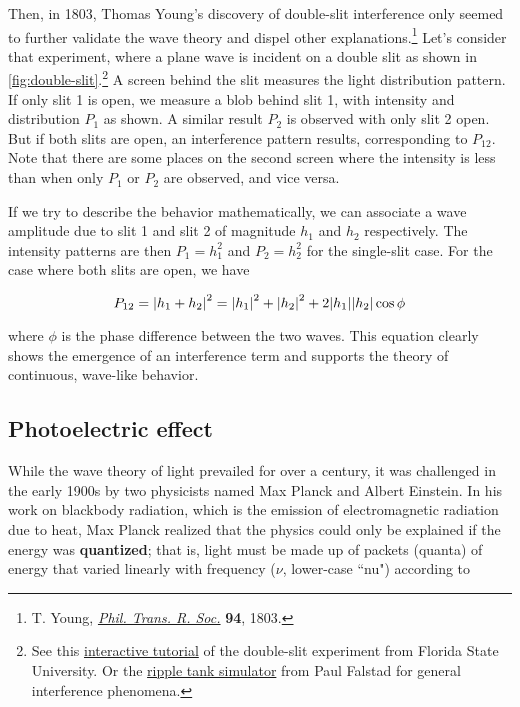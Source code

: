 Then, in 1803, Thomas Young's discovery of double-slit interference only seemed to further validate the wave theory and dispel other explanations.\footnote{T. Young, \href{https://royalsocietypublishing.org/doi/abs/10.1098/rstl.1804.0001}{\emph{Phil. Trans. R. Soc.}} \textbf{94}, 1803.}
Let's consider that experiment, where a plane wave is incident on a double slit as shown in \autoref{fig:double-slit}.\footnote{See this \href{http://micro.magnet.fsu.edu/primer/java/interference/doubleslit/}{interactive tutorial} of the double-slit experiment from Florida State University.
Or the \href{https://falstad.com/ripple/}{ripple tank simulator} from Paul Falstad for general interference phenomena.} 
A screen behind the slit measures the light distribution pattern. 
If only slit 1 is open, we measure a blob behind slit 1, with intensity and distribution $P_1$ as shown. 
A similar result $P_2$ is observed with only slit 2 open. 
But if both slits are open, an interference pattern results, corresponding to $P_{12}$. 
Note that there are some places on the second screen where the intensity is less than when only $P_1$ or $P_2$ are observed, and vice versa.

If we try to describe the behavior mathematically, we can associate a wave amplitude due to slit 1 and slit 2 of magnitude $h_1$ and $h_2$ respectively. 
The intensity patterns are then $P_1 = h_1^2$ and $P_2 = h_2^2$ for the single-slit case. 
For the case where both slits are open, we have

\begin{equation}
	P_{12} = \abs{h_1+h_2}^2 = \abs{h_1}^2 + \abs{h_2}^2 + 2\abs{h_1}\abs{h_2} \cos \phi  \label{eq:interf}
\end{equation}

\noindent where $\phi$ is the phase difference between the two waves. 
This equation clearly shows the emergence of an interference term and supports the theory of continuous, wave-like behavior.


\subsection{Photoelectric effect}

While the wave theory of light prevailed for over a century, it was challenged in the early 1900s by two physicists named Max Planck and Albert Einstein. 
In his work on blackbody radiation, which is the emission of electromagnetic radiation due to heat, Max Planck realized that the physics could only be explained if the energy was \textbf{quantized}; that is, light must be made up of packets (quanta) of energy that varied linearly with frequency ($\nu$, lower-case ``nu") according to

